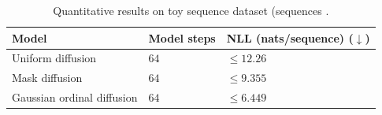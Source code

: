 \begin{table}[h!]
  \caption{Quantitative results on toy sequence dataset (sequences .}
  \label{tab:toy}
  \small
  \centering
  \begin{tabular}{lll}
    \toprule
    Model & Model steps & NLL (nats/sequence) ($\downarrow$)\\
    \midrule
    Uniform diffusion & $64$  & $\leq 12.26$  \\
    Mask diffusion & $64$ & $\leq 9.355$ \\
    Gaussian ordinal diffusion & $64$ & $\leq 6.449$ \\
    \bottomrule
  \end{tabular}
\end{table}
